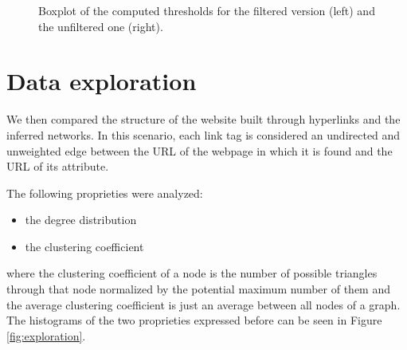 \begin{figure}[ht]
    \centering
    \caption{Boxplot of the computed thresholds for the filtered version (left) and the unfiltered one (right).}
    \label{fig:threshold-box}
\end{figure}

\section{Data exploration} \label{dataexp}
We then compared the structure of the website built through hyperlinks and the inferred networks. 
In this scenario, each link tag is considered an undirected and unweighted edge 
between the URL of the webpage in which it is found and the URL of its  attribute.

The following proprieties were analyzed:
\begin{itemize}
    \item the degree distribution
    \item the clustering coefficient
\end{itemize}
where the clustering coefficient of a node is the number of possible triangles through that node normalized 
by the potential maximum number of them 
and the average clustering coefficient is just an average between all nodes of a graph.
The histograms of the two proprieties expressed before can be seen in Figure \ref{fig:exploration}. 

